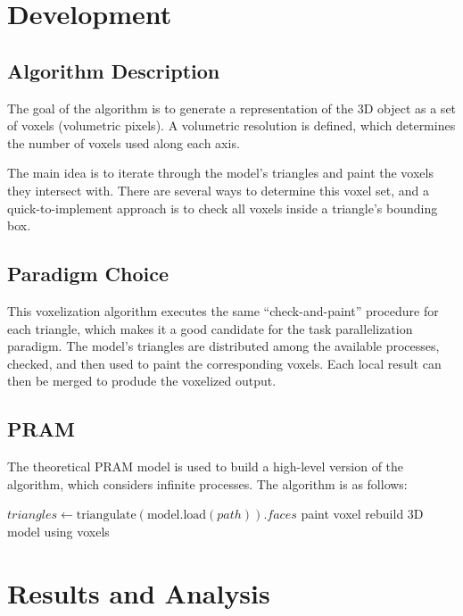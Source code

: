 \documentclass[conference]{IEEEtran}
\begin{document}
\section{Development}
\subsection{Algorithm Description}
The goal of the algorithm is to generate a representation of the 3D object as a
set of voxels (volumetric pixels). A volumetric resolution is defined, which
determines the number of voxels used along each axis.

The main idea is to iterate through the model's triangles and paint the voxels
they intersect with. There are several ways to determine this voxel set, and a
quick-to-implement approach is to check all voxels inside a triangle's bounding
box.

\subsection{Paradigm Choice}
This voxelization algorithm executes the same ``check-and-paint'' procedure for
each triangle, which makes it a good candidate for the task parallelization
paradigm. The model's triangles are distributed among the available processes,
checked, and then used to paint the corresponding voxels. Each local result can
then be merged to produde the voxelized output.

\subsection{PRAM}
The theoretical PRAM model is used to build a high-level version of the
algorithm, which considers infinite processes. The algorithm is as follows:

\begin{algorithm}
    \caption{Voxelization (PRAM)}
    \begin{algorithmic}[1]
        \State{} $triangles \gets \text{triangulate}(\text{model.load}(path)).faces$
        \State{} paint voxel
        \EndFor{}
        \EndFor{}
        \State{} rebuild 3D model using voxels
    \end{algorithmic}
\end{algorithm}

\section{Results and Analysis}
\end{document}
